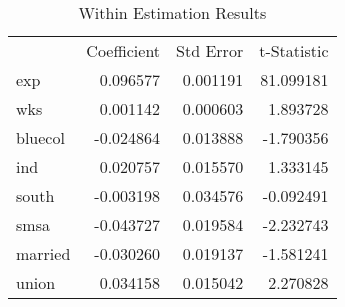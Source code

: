 \begin{table}[h]\centering
\begin{tabular}{lrrr}
 & Coefficient & Std Error & t-Statistic \\
exp & 0.096577 & 0.001191 & 81.099181 \\
wks & 0.001142 & 0.000603 & 1.893728 \\
bluecol & -0.024864 & 0.013888 & -1.790356 \\
ind & 0.020757 & 0.015570 & 1.333145 \\
south & -0.003198 & 0.034576 & -0.092491 \\
smsa & -0.043727 & 0.019584 & -2.232743 \\
married & -0.030260 & 0.019137 & -1.581241 \\
union & 0.034158 & 0.015042 & 2.270828 \\
\end{tabular}

\caption{Within Estimation Results}
\label{tab:within_estimation}
\end{table}
